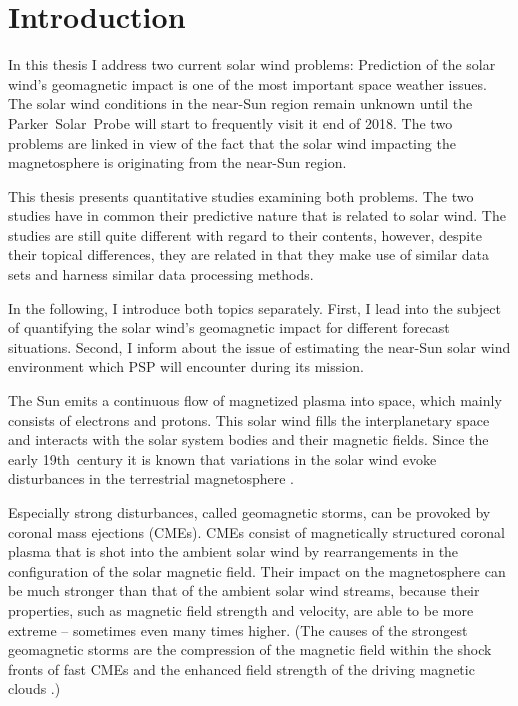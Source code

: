 
\chapter{Introduction}
\label{chap:introduction}


In this thesis I address two current solar wind problems: Prediction of the solar wind's geomagnetic impact is one of the most important space weather issues. The solar wind conditions in the near-Sun region remain unknown until the Parker~Solar~Probe will start to frequently visit it end of 2018. The two problems are linked in view of the fact that the solar wind impacting the magnetosphere is originating from the near-Sun region.

This thesis presents quantitative studies examining both problems. The two studies have in common their predictive nature that is related to solar wind. The studies are still quite different with regard to their contents, however, despite their topical differences, they are related in that they make use of similar data sets and harness similar data processing methods.

In the following, I introduce both topics separately. First, I lead into the subject of quantifying the solar wind's geomagnetic impact for different forecast situations. Second, I inform about the issue of estimating the near-Sun solar wind environment which PSP will encounter during its mission.

\bigskip


The Sun emits a continuous flow of magnetized plasma into space, which mainly consists of electrons and protons. This solar wind fills the interplanetary space and interacts with the solar system bodies and their magnetic fields. Since the early 19th~century it is known that variations in the solar wind evoke disturbances in the terrestrial magnetosphere \citep{Bartels1962}.

Especially strong disturbances, called geomagnetic storms, can be provoked by coronal mass ejections (CMEs). CMEs consist of magnetically structured coronal plasma that is shot into the ambient solar wind by rearrangements in the configuration of the solar magnetic field. Their impact on the magnetosphere can be much stronger than that of the ambient solar wind streams, because their properties, such as magnetic field strength and velocity, are able to be more extreme -- sometimes even many times higher.
(The causes of the strongest geomagnetic storms are the compression of the magnetic field within the shock fronts of fast CMEs and the enhanced field strength of the driving magnetic clouds \citep{Bothmer1995}.)

